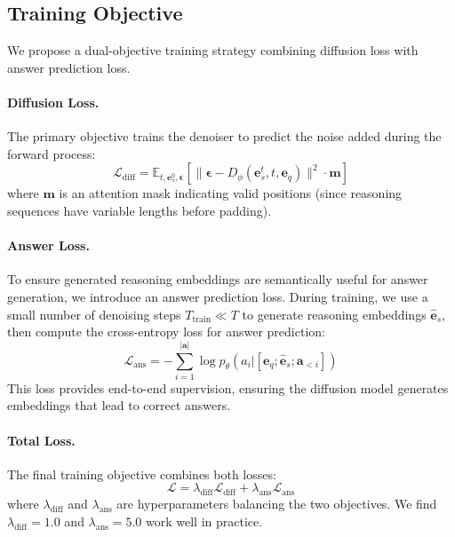\documentclass{article}
\newcommand{\mcL}{\mathcal{L}}
\newcommand{\be}{\mathbf{e}}
\newcommand{\ba}{\mathbf{a}}
\begin{document}
\subsection{Training Objective}
\label{sec:training}

We propose a dual-objective training strategy combining diffusion loss with answer prediction loss.

\paragraph{Diffusion Loss.}
The primary objective trains the denoiser to predict the noise added during the forward process:
\begin{equation}
    \mcL_\text{diff} = \mathbb{E}_{t, \be_s^0, \bm{\epsilon}}\left[\|\bm{\epsilon} - D_\phi(\be_s^t, t, \be_q)\|^2 \cdot \mathbf{m}\right]
\end{equation}
where $\mathbf{m}$ is an attention mask indicating valid positions (since reasoning sequences have variable lengths before padding).

\paragraph{Answer Loss.}
To ensure generated reasoning embeddings are semantically useful for answer generation, we introduce an answer prediction loss. During training, we use a small number of denoising steps $T_\text{train} \ll T$ to generate reasoning embeddings $\hat{\be}_s$, then compute the cross-entropy loss for answer prediction:
\begin{equation}
    \mcL_\text{ans} = -\sum_{i=1}^{|\ba|} \log p_\theta(a_i | [\be_q; \hat{\be}_s; \ba_{<i}])
\end{equation}
This loss provides end-to-end supervision, ensuring the diffusion model generates embeddings that lead to correct answers.

\paragraph{Total Loss.}
The final training objective combines both losses:
\begin{equation}
    \mcL = \lambda_\text{diff} \mcL_\text{diff} + \lambda_\text{ans} \mcL_\text{ans}
\end{equation}
where $\lambda_\text{diff}$ and $\lambda_\text{ans}$ are hyperparameters balancing the two objectives. We find $\lambda_\text{diff}=1.0$ and $\lambda_\text{ans}=5.0$ work well in practice.
\end{document}
